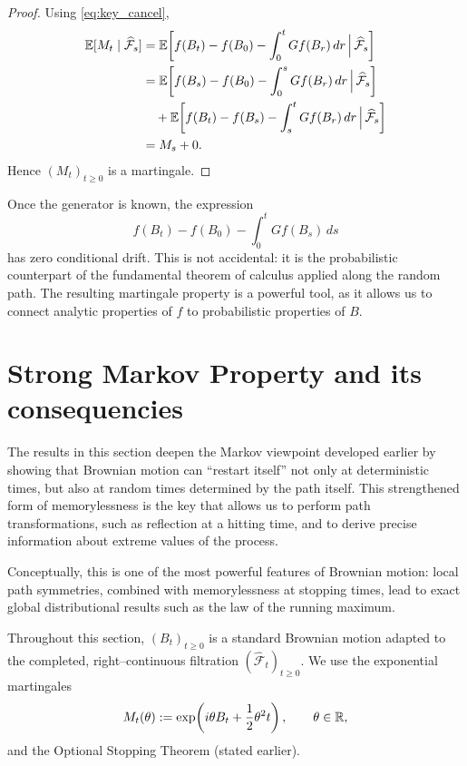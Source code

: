 \begin{proof}
\medskip
{}
Using \eqref{eq:key_cancel},
\begin{align*}
\mathbb{E}[M_t\mid \widehat{\mathcal F}_s]
&=\mathbb{E}\!\left[f(B_t)-f(B_0)-\int_0^t Gf(B_r)\,dr \,\Big|\, \widehat{\mathcal F}_s\right]\\
&=\mathbb{E}\!\left[f(B_s)-f(B_0)-\int_0^s Gf(B_r)\,dr \,\Big|\, \widehat{\mathcal F}_s\right]\\
&\quad+\mathbb{E}\!\left[f(B_t)-f(B_s)-\int_s^t Gf(B_r)\,dr \,\Big|\, \widehat{\mathcal F}_s\right]\\
&=M_s + 0.
\end{align*}
Hence $(M_t)_{t\ge0}$ is a martingale.
\end{proof}

\begin{remark}
Once the generator is known, the expression
\[
f(B_t)-f(B_0)-\int_0^t Gf(B_s)\,ds
\]
has zero conditional drift.
This is not accidental: it is the probabilistic counterpart of the fundamental theorem of calculus
applied along the random path.
The resulting martingale property is a powerful tool, as it allows us to connect analytic properties of $f$
to probabilistic properties of $B$.    
\end{remark}




\section{Strong Markov Property and its consequencies}


The results in this section deepen the Markov viewpoint developed earlier by showing that
Brownian motion can ``restart itself'' not only at deterministic times, but also at random
times determined by the path itself.
This strengthened form of memorylessness is the key that allows us to perform path
transformations, such as reflection at a hitting time, and to derive precise information
about extreme values of the process.

Conceptually, this is one of the most powerful features of Brownian motion:
local path symmetries, combined with memorylessness at stopping times, lead to exact global
distributional results such as the law of the running maximum.

Throughout this section, $(B_t)_{t\ge0}$ is a standard Brownian motion adapted to the
completed, right--continuous filtration $(\widehat{\mathcal F}_t)_{t\ge0}$.
We use the exponential martingales
\[
M_t(\theta):=\exp\!\left(i\theta B_t+\frac12\theta^2 t\right),
\qquad \theta\in\mathbb{R},
\]
and the Optional Stopping Theorem (stated earlier).

